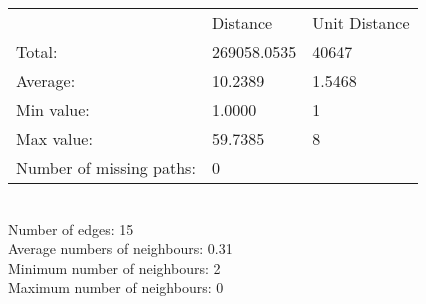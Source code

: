 \begin{tabular}{lll}
 & Distance & Unit Distance\\
Total: & 269058.0535 & 40647\\
Average: & 10.2389 & 1.5468\\
Min value: & 1.0000 & 1\\
Max value: & 59.7385 & 8\\
\hline
Number of missing paths: & 0 &\\
\end{tabular}\\
Number of edges: 15\\
Average numbers of neighbours: 0.31\\
Minimum number of neighbours: 2\\
Maximum number of neighbours: 0\\
